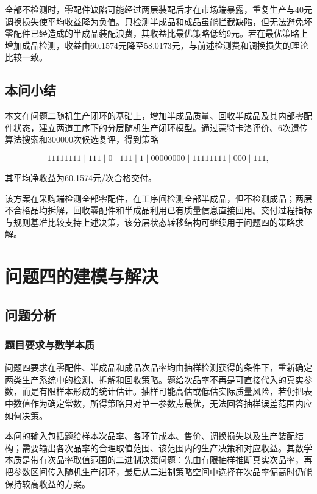 \documentclass{cumcm}
\numberwithin{figure}{section}
\numberwithin{table}{section}
\begin{document}
全部不检测时，零配件缺陷可能经过两层装配后才在市场端暴露，重复生产与40元调换损失使平均收益降为负值。只检测半成品和成品虽能拦截缺陷，但无法避免坏零配件已经造成的半成品装配浪费，其收益比最优策略低约9元。若在最优策略上增加成品检测，收益由60.1574元降至58.0173元，与前述检测费和调换损失的理论比较一致。

\subsection{本问小结}\label{ux672cux95eeux5c0fux7ed3}

本文在问题二随机生产闭环的基础上，增加半成品质量、回收半成品及其内部零配件状态，建立两道工序下的分层随机生产闭环模型。通过蒙特卡洛评价、6次遗传算法搜索和300000次候选复评，得到策略

\[
11111111\mid111\mid0\mid111\mid1
\mid00000000\mid11111111\mid000\mid111,
\]

其平均净收益为60.1574元/次合格交付。

该方案在采购端检测全部零配件，在工序间检测全部半成品，但不检测成品；两层不合格品均拆解，回收零配件和半成品利用已有质量信息直接回用。交付过程指标与规则基准比较支持上述决策，该分层状态转移结构可继续用于问题四的策略求解。

\FloatBarrier
\section{问题四的建模与解决}\label{ux95eeux9898ux56dbux7684ux5efaux6a21ux4e0eux89e3ux51b3}

\subsection{问题分析}\label{ux95eeux9898ux5206ux6790-1}

\subsubsection{题目要求与数学本质}\label{ux9898ux76eeux8981ux6c42ux4e0eux6570ux5b66ux672cux8d28}

问题四要求在零配件、半成品和成品次品率均由抽样检测获得的条件下，重新确定两类生产系统中的检测、拆解和回收策略。题给次品率不再是可直接代入的真实参数，而是有限样本形成的统计估计。抽样可能高估或低估实际质量风险，若仍把表中数值作为确定常数，所得策略只对单一参数点最优，无法回答抽样误差范围内应如何决策。

本问的输入包括题给样本次品率、各环节成本、售价、调换损失以及生产装配结构；需要输出各次品率的合理取值范围、该范围内的生产决策和对应收益。其数学本质是带有次品率取值范围的二进制决策问题：先由有限抽样推断真实次品率，再把参数区间传入随机生产闭环，最后从二进制策略空间中选择在次品率偏高时仍能保持较高收益的方案。
\end{document}
